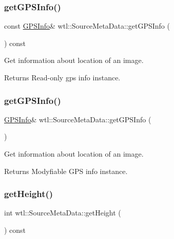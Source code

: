 \subsubsection{\texorpdfstring{get\+G\+P\+S\+Info()}{getGPSInfo()}\hspace{0.1cm}{\footnotesize\ttfamily [1/2]}}
{\footnotesize\ttfamily const \hyperlink{classwtl_1_1_g_p_s_info}{G\+P\+S\+Info}\& wtl\+::\+Source\+Meta\+Data\+::get\+G\+P\+S\+Info (\begin{DoxyParamCaption}{ }\end{DoxyParamCaption}) const}



Get information about location of an image. 

\begin{DoxyReturn}{Returns}
Read-\/only gps info instance. 
\end{DoxyReturn}
\mbox{\label{classwtl_1_1_source_meta_data_a7b98944eaf50b06c4065ede57e13342e}} 
\subsubsection{\texorpdfstring{get\+G\+P\+S\+Info()}{getGPSInfo()}\hspace{0.1cm}{\footnotesize\ttfamily [2/2]}}
{\footnotesize\ttfamily \hyperlink{classwtl_1_1_g_p_s_info}{G\+P\+S\+Info}\& wtl\+::\+Source\+Meta\+Data\+::get\+G\+P\+S\+Info (\begin{DoxyParamCaption}{ }\end{DoxyParamCaption})}



Get information about location of an image. 

\begin{DoxyReturn}{Returns}
Modyfiable G\+PS info instance. 
\end{DoxyReturn}
\mbox{\label{classwtl_1_1_source_meta_data_a4053efeed2a7777d236640c94a411862}} 
\subsubsection{\texorpdfstring{get\+Height()}{getHeight()}}
{\footnotesize\ttfamily int wtl\+::\+Source\+Meta\+Data\+::get\+Height (\begin{DoxyParamCaption}{ }\end{DoxyParamCaption}) const}



